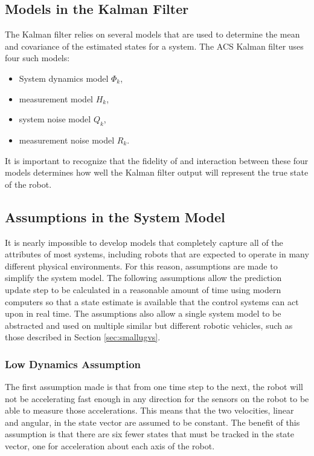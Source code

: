 \subsection{Models in the Kalman Filter}
\label{sec:kfModels}
The Kalman filter relies on several models that are used to determine the mean and covariance of the estimated states for a system. The ACS Kalman filter uses four such models:
\begin{itemize}
\item System dynamics model $\Phi_k$,
\item measurement model $H_k$,
\item system noise model $Q_k$,
\item measurement noise model $R_k$.
\end{itemize}

It is important to recognize that the fidelity of and interaction between these four models determines how well the Kalman filter output will represent the true state of the robot.

\subsection{Assumptions in the System Model}
\label{sec:kfAssumptions}
It is nearly impossible to develop models that completely capture all of the attributes of most systems, including robots that are expected to operate in many different physical environments. For this reason, assumptions are made to simplify the system model. The following assumptions allow the prediction update step to be calculated in a reasonable amount of time using modern computers so that a state estimate is available that the control systems can act upon in real time. The assumptions also allow a single system model to be abstracted and used on multiple similar but different robotic vehicles, such as those described in Section \ref{sec:smallugvs}.

\subsubsection{Low Dynamics Assumption}
\label{sec:kfLowDynamicsAssumption}
The first assumption made is that from one time step to the next, the robot will not be accelerating fast enough in any direction for the sensors on the robot to be able to measure those accelerations. This means that the two velocities, linear and angular, in the state vector are assumed to be constant. The benefit of this assumption is that there are six fewer states that must be tracked in the state vector, one for acceleration about each axis of the robot.

